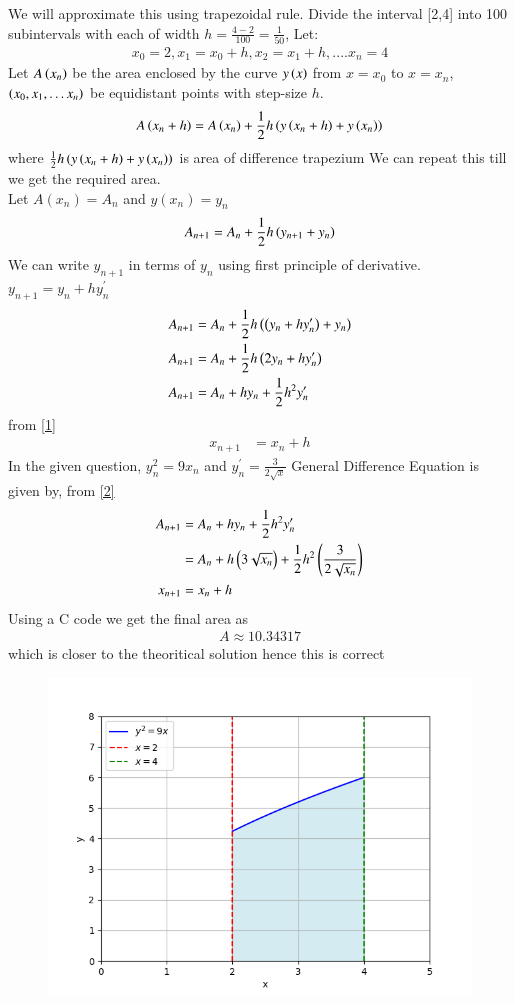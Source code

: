 \documentclass[journal]{IEEEtran}
\numberwithin{equation}{enumi}
\numberwithin{figure}{enumi}
\begin{document}
We will approximate this using trapezoidal rule. Divide the interval [2,4] into 100 subintervals with each of width $h=\frac{4-2}{100}=\frac{1}{50}$, Let:
\begin{align}
x_0=2,x_1=x_0+h,x_2=x_1+h,....x_n=4\label{1}
\end{align}
Let $A\left(x_n\right)$ be the area enclosed by the curve $y\left(x\right)$ from $x=x_0$ to $x=x_n$, $\left(x_0, x_1, \dots x_n\right)$ be equidistant points with step-size $h$.
\begin{align}
  A\left(x_n+h\right)=A\left(x_n\right)+\frac{1}{2}h\left(y\left(x_n+h\right)+y\left(x_n\right)\right)
\end{align}
where $\frac{1}{2}h\left(y\left(x_n+h\right)+y\left(x_n\right)\right)$ is area of difference trapezium
We can repeat this till we get the required area.\\
Let $A(x_n)=A_n$ and $y(x_n)=y_n$
\begin{align}
        A_{n+1}=A_n+\frac{1}{2}h\left(y_{n+1}+y_n\right)
\end{align}
We can write $y_{n+1}$ in terms of $y_n$ using first principle of derivative. $y_{n+1}=y_n+hy^{\prime}_n$
\begin{align}
  A_{n+1}&=A_n+\frac{1}{2}h\left(\left(y_{n}+hy^{\prime}_n\right)+y_n\right)\\
  A_{n+1}&=A_n+\frac{1}{2}h\left(2y_n+hy^{\prime}_n\right)\\
  A_{n+1}&=A_n+hy_n+\frac{1}{2}h^2y^{\prime}_n \label{2} \\
\end{align}
from \ref{1} 
\begin{align}
    x_{n+1}&=x_n+h
\end{align}
In the given question, $y_n^2=9x_n$ and $y^{\prime}_n=\frac{3}{2\sqrt{x}}$\newline
General Difference Equation is given by, from \ref{2}
\begin{align}
  A_{n+1}&=A_n+hy_n+\frac{1}{2}h^2y^{\prime}_n\\
  &=A_n+h\left(3\sqrt{x_n}\right)+\frac{1}{2}h^2\left(\frac{3}{2\sqrt{x_n}}\right)\\
  x_{n+1}&=x_n+h
\end{align}
Using a C code we get the final area as
\begin{align}
    A\approx10.34317
\end{align}
which is closer to the theoritical solution hence this is correct
\begin{figure}[!ht]
    \centering
    \includegraphics[width=\columnwidth]{figs/Figure_1.png}
    \caption{}
\end{figure}
\end{document}

